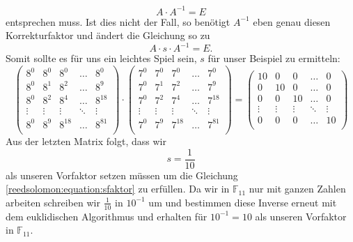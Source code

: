 \[
A \cdot A^{-1} = E
\]
entsprechen muss.
Ist dies nicht der Fall, so benötigt $A^{-1}$ eben genau diesen Korrekturfaktor und ändert die Gleichung so zu
\begin{equation}
	A \cdot s \cdot A^{-1} = E.
	\label{reedsolomon:equation:sfaktor}
\end{equation}
Somit sollte es für uns ein leichtes Spiel sein, $s$ für unser Beispiel zu ermitteln:
\[
\begin{pmatrix}
	8^0 & 8^0 & 8^0 & \dots & 8^0 \\
	8^0 & 8^1 & 8^2 & \dots & 8^9 \\
	8^0 & 8^2 & 8^4 & \dots & 8^{18} \\
	\vdots & \vdots & \vdots & \ddots & \vdots \\
	8^0 & 8^9 & 8^{18} & \dots & 8^{81} \\
\end{pmatrix}
\cdot
\begin{pmatrix}
	7^0 & 7^0 & 7^0 & \dots & 7^0 \\
	7^0 & 7^{1} & 7^{2} & \dots & 7^{9} \\
	7^0 & 7^{2} & 7^{4} & \dots & 7^{18} \\
	\vdots & \vdots & \vdots & \ddots & \vdots \\
	7^0 & 7^{9} & 7^{18} & \dots & 7^{81} \\
\end{pmatrix}
=
\begin{pmatrix}
	10 & 0 & 0 & \dots & 0 \\
	0 & 10 & 0 & \dots & 0 \\
	0 & 0 & 10 & \dots & 0 \\
	\vdots & \vdots & \vdots  & \ddots & \vdots \\
	0 & 0 & 0 & \dots & 10 \\
\end{pmatrix}
\]
Aus der letzten Matrix folgt, dass wir
\[
s = \dfrac{1}{10}
\]
als unseren Vorfaktor setzen müssen um die Gleichung \ref{reedsolomon:equation:sfaktor} zu erfüllen. Da wir in $\mathbb{F}_{11}$ nur mit ganzen Zahlen arbeiten schreiben wir $\frac{1}{10}$ in $10^{-1}$ um und bestimmen diese Inverse erneut mit dem euklidischen Algorithmus und erhalten für $10^{-1} = 10$ als unseren Vorfaktor in $\mathbb{F}_{11}$.
%
%

